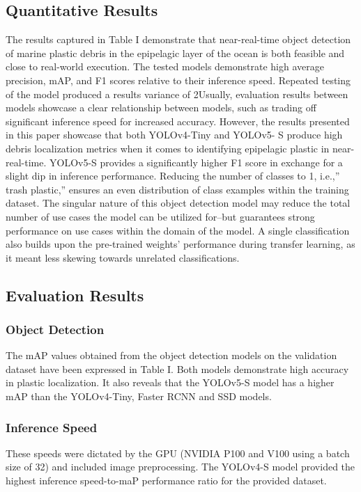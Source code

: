 \documentclass[a4paper,fleqn]{cas-dc}
\begin{document}
\subsection{Quantitative Results}
The results captured in Table I demonstrate that near-real-time object detection of marine plastic debris in the epipelagic layer of the ocean is both feasible and close to real-world execution. The tested models demonstrate high average precision, mAP, and F1 scores relative to their inference speed. Repeated testing of the model produced a results variance of 2Usually, evaluation results between models showcase a clear relationship between models, such as trading off significant inference speed for increased accuracy. However, the results presented in this paper showcase that both YOLOv4-Tiny and YOLOv5- S produce high debris localization metrics when it comes to identifying epipelagic plastic in near-real-time.
YOLOv5-S provides a significantly higher F1 score in
exchange for a slight dip in inference performance.
Reducing the number of classes to 1, i.e.,” trash plastic,” ensures an even distribution of class examples within the training dataset. The singular nature of this object detection model may reduce the total number of use cases the model can be utilized for–but guarantees strong performance on use cases within the domain of the model. A single classification also builds upon the pre-trained weights’ performance during transfer learning, as it meant less skewing towards unrelated classifications.


\subsection{Evaluation Results}

\subsubsection{Object Detection}
The mAP values obtained from the object detection models on the validation dataset have been expressed in Table I. Both models demonstrate high accuracy in plastic localization. It also reveals that the YOLOv5-S model has a higher mAP than the YOLOv4-Tiny, Faster RCNN and SSD models.


\subsubsection{Inference Speed}
These speeds were dictated by the GPU (NVIDIA P100 and V100 using a batch size of 32) and included image preprocessing. The YOLOv4-S model provided the highest inference speed-to-maP performance ratio for the provided dataset.
\end{document}
